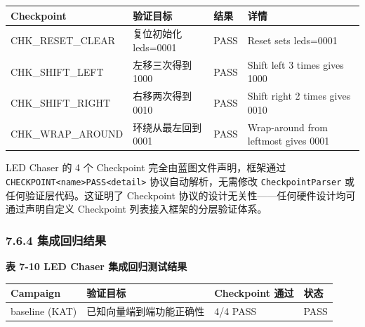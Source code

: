 {\def\LTcaptype{none} %
\begin{longtable}[]{@{}
  >{\raggedright\arraybackslash}p{}
  >{\raggedright\arraybackslash}p{}
  >{\raggedright\arraybackslash}p{}
  >{\raggedright\arraybackslash}p{}@{}}
\toprule\noalign{}
\begin{minipage}[b]{\linewidth}\raggedright
Checkpoint
\end{minipage} & \begin{minipage}[b]{\linewidth}\raggedright
验证目标
\end{minipage} & \begin{minipage}[b]{\linewidth}\raggedright
结果
\end{minipage} & \begin{minipage}[b]{\linewidth}\raggedright
详情
\end{minipage} \\
\midrule\noalign{}
\endhead
\bottomrule\noalign{}
\endlastfoot
CHK\_RESET\_CLEAR & 复位初始化 leds=0001 & PASS & Reset sets
leds=0001 \\
CHK\_SHIFT\_LEFT & 左移三次得到 1000 & PASS & Shift left 3 times gives
1000 \\
CHK\_SHIFT\_RIGHT & 右移两次得到 0010 & PASS & Shift right 2 times gives
0010 \\
CHK\_WRAP\_AROUND & 环绕从最左回到 0001 & PASS & Wrap-around from
leftmost gives 0001 \\
\end{longtable}
}

LED Chaser 的 4 个 Checkpoint 完全由蓝图文件声明，框架通过
\texttt{CHECKPOINT\textbar{}\textless{}name\textgreater{}\textbar{}PASS\textbar{}\textless{}detail\textgreater{}}
协议自动解析，无需修改 \texttt{CheckpointParser}
或任何验证层代码。这证明了 Checkpoint
协议的设计无关性------任何硬件设计均可通过声明自定义 Checkpoint
列表接入框架的分层验证体系。

\subsubsection{7.6.4
集成回归结果}\label{ux96c6ux6210ux56deux5f52ux7ed3ux679c}

\textbf{表 7-10 LED Chaser 集成回归测试结果}

{\def\LTcaptype{none} %
\begin{longtable}[]{@{}llll@{}}
\toprule\noalign{}
Campaign & 验证目标 & Checkpoint 通过 & 状态 \\
\midrule\noalign{}
\endhead
\bottomrule\noalign{}
\endlastfoot
baseline (KAT) & 已知向量端到端功能正确性 & 4/4 PASS & PASS \\
\end{longtable}
}

